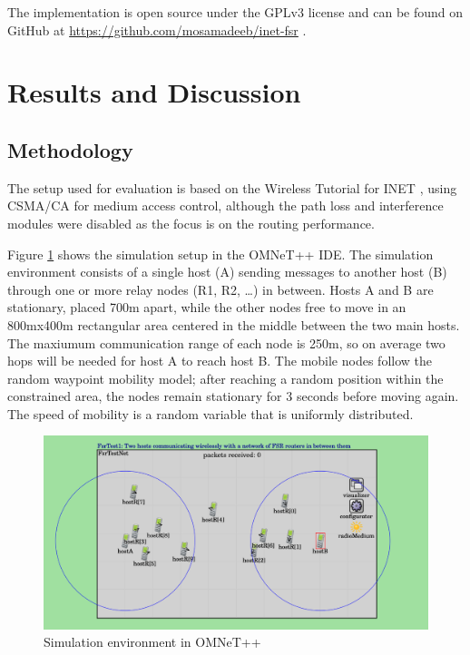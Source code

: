 \documentclass{winslabreport}
\begin{document}
The implementation is open source under the GPLv3 license and can be found on GitHub at \url{https://github.com/mosamadeeb/inet-fsr} \cite{eldeebInetFsr}.

\section{Results and Discussion}

\subsection{Methodology}
The setup used for evaluation is based on the Wireless Tutorial for INET \cite{WirelessTutorialINET}, using CSMA/CA for medium access control, although the path loss and interference modules were disabled as the focus is on the routing performance.

Figure \ref{fig:sim_env} shows the simulation setup in the OMNeT++ IDE. The simulation environment consists of a single host (A) sending messages to another host (B) through one or more relay nodes (R1, R2, \dots) in between. Hosts A and B are stationary, placed 700m apart, while the other nodes free to move in an 800mx400m rectangular area centered in the middle between the two main hosts. The maxiumum communication range of each node is 250m, so on average two hops will be needed for host A to reach host B. The mobile nodes follow the random waypoint mobility model; after reaching a random position within the constrained area, the nodes remain stationary for 3 seconds before moving again. The speed of mobility is a random variable that is uniformly distributed.

\begin{figure}
    \centering
    \includegraphics[width=\textwidth]{../figures/simulation_example.png}
    \caption{Simulation environment in OMNeT++}
    \label{fig:sim_env}
\end{figure}
\end{document}
